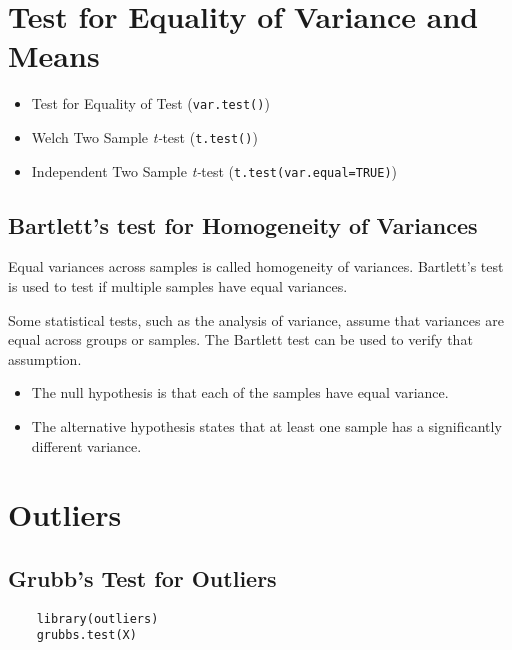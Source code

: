 



\section{Test for Equality of Variance and Means}

\begin{itemize}
\item Test for Equality of Test (\texttt{var.test()})
\item Welch Two Sample \emph{t-}test (\texttt{t.test()})
\item Independent Two Sample \emph{t-}test (\texttt{t.test(var.equal=TRUE)})

\end{itemize}

\subsection{Bartlett's test for Homogeneity of Variances}
 

Equal variances across samples is called homogeneity of variances. Bartlett's test is used to test if multiple samples have equal variances. 

Some statistical tests, such as the analysis of variance, assume that variances are equal across groups or samples.  The Bartlett test can be used to verify that assumption.

\begin{itemize}
\item The null hypothesis is that each of the samples have equal variance.
\item The alternative hypothesis states that at least one sample has a significantly different variance.
\end{itemize}

\newpage
\section{Outliers}
\subsection{Grubb's Test for Outliers}
\begin{framed}
	\begin{verbatim}
	library(outliers)
	grubbs.test(X)
	\end{verbatim}
\end{framed}
